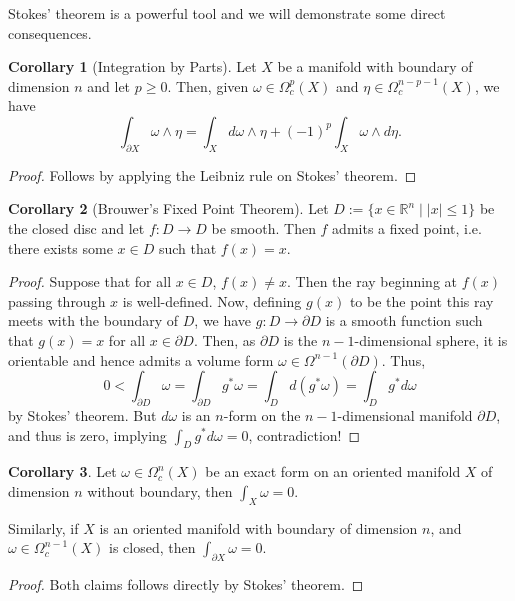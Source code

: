 \documentclass[]{article}
\theoremstyle{definition}
\newtheorem{corollary}{Corollary}[theorem]
\theoremstyle{definition}
\begin{document}
Stokes' theorem is a powerful tool and we will demonstrate some direct consequences.

\begin{corollary}[Integration by Parts]
  Let \(X\) be a manifold with boundary of dimension \(n\) and let \(p \ge 0\). 
  Then, given \(\omega \in \Omega^p_c(X)\) and \(\eta \in \Omega_c^{n - p - 1}(X)\), 
  we have 
  \[\int_{\partial X} \omega \wedge \eta = \int_X d\omega \wedge \eta + 
    (-1)^p \int_X \omega \wedge d\eta.\]
\end{corollary}
\begin{proof}
  Follows by applying the Leibniz rule on Stokes' theorem.
\end{proof}

\begin{corollary}[Brouwer's Fixed Point Theorem]
  Let \(D := \{x \in \mathbb{R}^n \mid |x| \le 1\}\) be the closed disc and let 
  \(f : D \to D\) be smooth. Then \(f\) admits a fixed point, i.e. there exists 
  some \(x \in D\) such that \(f(x) = x\).
\end{corollary}
\begin{proof}
  Suppose that for all \(x \in D\), \(f(x) \neq x\). Then the ray beginning at 
  \(f(x)\) passing through \(x\) is well-defined. Now, defining \(g(x)\) to be 
  the point this ray meets with the boundary of \(D\), we have \(g : D \to \partial D\) 
  is a smooth function such that \(g(x) = x\) for all \(x \in \partial D\). 
  Then, as \(\partial D\) is the \(n - 1\)-dimensional sphere, it is orientable 
  and hence admits a volume form \(\omega\in \Omega^{n-1}(\partial D)\). Thus, 
  \[0 < \int_{\partial D} \omega = \int_{\partial D} g^* \omega = 
  \int_D d(g^* \omega) = \int_D g^* d\omega\]
  by Stokes' theorem. But \(d\omega\) is an \(n\)-form on the 
  \(n - 1\)-dimensional manifold \(\partial D\), and thus is zero, implying 
  \(\int_D g^* d\omega = 0\), contradiction!
\end{proof}

\begin{corollary}
  Let \(\omega \in \Omega^n_c(X)\) be an exact form on an oriented manifold 
  \(X\) of dimension \(n\) without boundary, then \(\int_X \omega = 0\).

  Similarly, if \(X\) is an oriented manifold with boundary of dimension \(n\), 
  and \(\omega \in \Omega^{n - 1}_c(X)\) is closed, then \(\int_{\partial X} \omega = 0\).
\end{corollary}
\begin{proof}
  Both claims follows directly by Stokes' theorem.
\end{proof}
\end{document}
